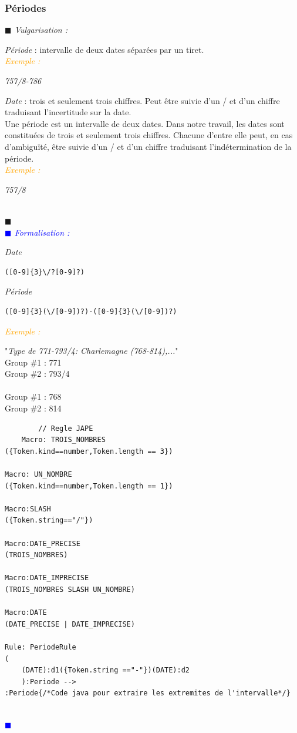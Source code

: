 \documentclass[a4paper, 11pt]{book}
\newenvironment{vulgarisation}
    {
    \textit{\textcolor{dark-blue}{$\blacksquare$  Vulgarisation : \\}}

    }
    {
    ~\\\textcolor{dark-blue}{$\blacksquare$}\\
    }
\newenvironment{formalisation}
    {
    \textit{\textcolor{blue}{$\blacksquare$  Formalisation : \\}}
    }
    {
    ~\\\textcolor{blue}{$\blacksquare$}\\
    }
\newenvironment{exemple}
    {
    \textit{\textcolor{orange}{
    Exemple : \\}}
    }
    {\\
    }
\begin{document}
\subsubsection{Périodes}
\begin{vulgarisation}
	\textit{Période} : intervalle de deux dates séparées par un tiret.\\
	\begin{exemple}
		\textit{757/8-786}
	\end{exemple}
	
	\textit{Date} : trois et seulement trois chiffres. Peut être suivie d'un \og/\fg{} et d'un chiffre traduisant l'incertitude sur la date.\\
	Une période est un intervalle de deux dates. Dans notre travail, les dates sont constituées de trois et seulement trois chiffres. Chacune d'entre elle peut, en cas d’ambiguïté, être suivie d'un \og/\fg{} et d'un chiffre traduisant l'indétermination de la période.\\
	\begin{exemple}
		\textit{757/8}
	\end{exemple}
	
\end{vulgarisation}
\begin{formalisation}
	\textit{Date}
	\begin{verbatim}
([0-9]{3}\/?[0-9]?)
	\end{verbatim}
	\textit{Période}
	\begin{verbatim}
([0-9]{3}(\/[0-9])?)-([0-9]{3}(\/[0-9])?)
	\end{verbatim}
	\begin{exemple}
		"\emph{Type de 771-793/4: Charlemagne (768-814),...}" \\
		Group \#1 : 771 \\
		Group \#2 : 793/4\\\\\noindent
		Group \#1 : 768 \\
		Group \#2 : 814
	\end{exemple}
	\begin{lstlisting}
		// Regle JAPE
	Macro: TROIS_NOMBRES
({Token.kind==number,Token.length == 3})

Macro: UN_NOMBRE
({Token.kind==number,Token.length == 1})

Macro:SLASH
({Token.string=="/"})

Macro:DATE_PRECISE
(TROIS_NOMBRES)

Macro:DATE_IMPRECISE
(TROIS_NOMBRES SLASH UN_NOMBRE)

Macro:DATE
(DATE_PRECISE | DATE_IMPRECISE)

Rule: PeriodeRule
(
	(DATE):d1({Token.string =="-"})(DATE):d2
    ):Periode -->
:Periode{/*Code java pour extraire les extremites de l'intervalle*/}
	\end{lstlisting}
\end{formalisation}
\newpage
\end{document}
